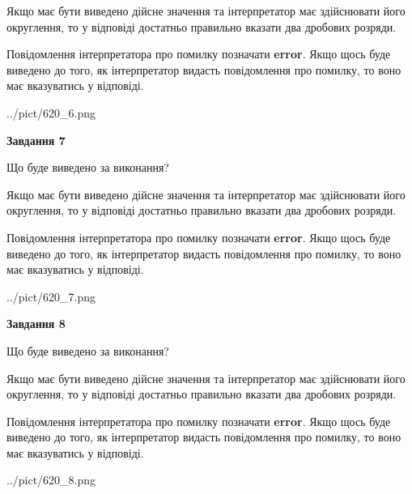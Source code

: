 \documentclass[12pt, ukrainian]{article}
\begin{document}
{\begin {Large}
Якщо має бути виведено дійсне значення та інтерпретатор має здійснювати його округлення, 
то у відповіді достатньо правильно вказати два дробових розряди.

Повідомлення інтерпретатора про помилку позначати \textbf{error}.
Якщо щось буде виведено до того, як інтерпретатор видасть повідомлення про помилку, 
то воно має вказуватись у відповіді. \par

\begin{center}
	{../pict/620_6.png}
\end{center}
\newpage

{\begin {center}\textbf{Завдання 7}\end {center}}\par
Що буде виведено за виконання? \par

Якщо має бути виведено дійсне значення та інтерпретатор має здійснювати його округлення, 
то у відповіді достатньо правильно вказати два дробових розряди.

Повідомлення інтерпретатора про помилку позначати \textbf{error}.
Якщо щось буде виведено до того, як інтерпретатор видасть повідомлення про помилку, 
то воно має вказуватись у відповіді. \par

\begin{center}
	{../pict/620_7.png}
\end{center}
\newpage

{\begin {center}\textbf{Завдання 8}\end {center}}\par
Що буде виведено за виконання? \par

Якщо має бути виведено дійсне значення та інтерпретатор має здійснювати його округлення, 
то у відповіді достатньо правильно вказати два дробових розряди.

Повідомлення інтерпретатора про помилку позначати \textbf{error}.
Якщо щось буде виведено до того, як інтерпретатор видасть повідомлення про помилку, 
то воно має вказуватись у відповіді. \par

\begin{center}
	{../pict/620_8.png}
\end{center}
\newpage


\end{Large}}
\end{document}
